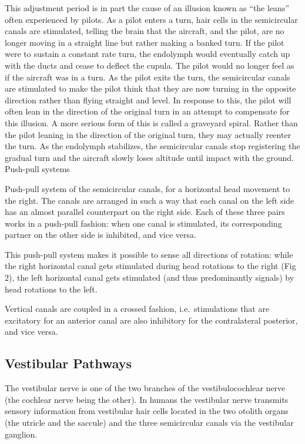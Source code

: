 This adjustment period is in part the cause of an illusion known as ``the leans'' often experienced by pilots. As a pilot enters a turn, hair cells in the semicircular canals are stimulated, telling the brain that the aircraft, and the pilot, are no longer moving in a straight line but rather making a banked turn. If the pilot were to sustain a constant rate turn, the endolymph would eventually catch up with the ducts and cease to deflect the cupula. The pilot would no longer feel as if the aircraft was in a turn. As the pilot exits the turn, the semicircular canals are stimulated to make the pilot think that they are now turning in the opposite direction rather than flying straight and level. In response to this, the pilot will often lean in the direction of the original turn in an attempt to compensate for this illusion. A more serious form of this is called a graveyard spiral. Rather than the pilot leaning in the direction of the original turn, they may actually reenter the turn. As the endolymph stabilizes, the semicircular canals stop registering the gradual turn and the aircraft slowly loses altitude until impact with the ground.
Push-pull systems

Push-pull system of the semicircular canals, for a horizontal head movement to the right.
The canals are arranged in such a way that each canal on the left side has an almost parallel counterpart on the right side. Each of these three pairs works in a push-pull fashion: when one canal is stimulated, its corresponding partner on the other side is inhibited, and vice versa.

This push-pull system makes it possible to sense all directions of rotation: while the right horizontal canal gets stimulated during head rotations to the right (Fig 2), the left horizontal canal gets stimulated (and thus predominantly signals) by head rotations to the left.

Vertical canals are coupled in a crossed fashion, i.e.~stimulations that are excitatory for an anterior canal are also inhibitory for the contralateral posterior, and vice versa.

\hypertarget{vestibular-pathways}{%
\subsection{Vestibular Pathways}\label{vestibular-pathways}}

The vestibular nerve is one of the two branches of the vestibulocochlear nerve (the cochlear nerve being the other). In humans the vestibular nerve transmits sensory information from vestibular hair cells located in the two otolith organs (the utricle and the saccule) and the three semicircular canals via the vestibular ganglion.

